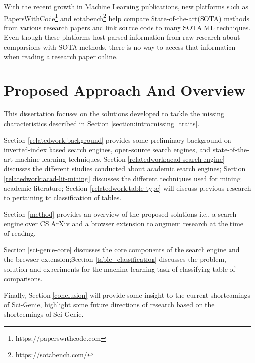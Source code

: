 With the recent growth in Machine Learning publications, new platforms such as PapersWithCode\footnote{https://paperswithcode.com} and sotabench\footnote{https://sotabench.com/} help compare State-of-the-art(SOTA) methods from various research papers and link source code to many SOTA ML techniques. Even though these platforms host parsed information from raw research about comparsions with SOTA methods, there is no way to access that information when reading a research paper online. 

\section{Proposed Approach And Overview}
This dissertation focuses on the solutions developed to tackle the missing characteristics described in Section \ref{section:intro:missing_traits}. 

Section \ref{relatedwork:background} provides some preliminary background on inverted-index based search engines, open-source search engines, and state-of-the-art machine learning techniques.
Section \ref{relatedwork:acad-search-engine} discusses the different studies conducted about academic search engines; Section \ref{relatedwork:acad-lit-mining} discusses the different techniques used for mining academic literature; Section \ref{relatedwork:table-type} will discuss previous research to pertaining to classification of tables. 

Section \ref{method} provides an overview of the proposed solutions i.e., a search engine over CS ArXiv and a browser extension to augment research at the time of reading. 

Section \ref{sci-genie-core} discusses the core components of the search engine and the browser extension;Section \ref{table_classification} discusses the problem, solution and experiments for the machine learning task of classifying table of comparisons.

Finally, Section \ref{conclusion} will provide some insight to the current shortcomings of Sci-Genie, highlight some future directions of research based on the shortcomings of Sci-Genie. 